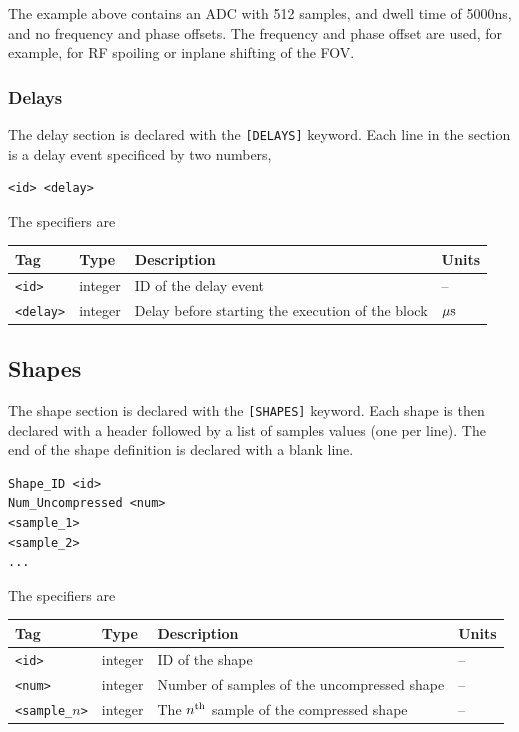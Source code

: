 \documentclass{article}
\begin{document}
The example above contains an ADC with 512 samples, and dwell time of 5000ns, and no frequency and phase offsets. The frequency and phase offset are used, for example, for RF spoiling or inplane shifting of the FOV.

\subsubsection{Delays}
The delay section is declared with the \verb.[DELAYS]. keyword. Each line in the section is a delay event specificed by two numbers,

\begin{lstlisting}
<id> <delay>
\end{lstlisting}

The specifiers are

\begin{tabularx}{\textwidth}{llXl}
\toprule
Tag & Type & Description & Units\\
\midrule
\verb.<id>. & integer & ID of the delay event & -- \\
\verb.<delay>. & integer & Delay before starting the execution of the block & $\rm \mu s$ \\
\bottomrule
\end{tabularx}

\subsection{Shapes}

The shape section is declared with the \verb.[SHAPES]. keyword. Each shape is then declared with a header followed by a list of samples values (one per line). The end of the shape definition is declared with a blank line.

\begin{lstlisting}
Shape_ID <id>
Num_Uncompressed <num>
<sample_1>
<sample_2>
...
\end{lstlisting}

The specifiers are

\begin{tabularx}{\textwidth}{llXl}
\toprule
Tag & Type & Description & Units\\
\midrule
\verb.<id>. & integer & ID of the shape & -- \\
\verb.<num>. & integer & Number of samples of the uncompressed shape & -- \\
\verb.<sample_.$n$\verb.>. & integer & The $n^{\rm th}$ sample of the compressed shape  & -- \\
\bottomrule
\end{tabularx}
\end{document}
